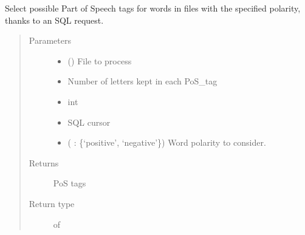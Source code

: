 \documentclass[letterpaper,10pt,english]{sphinxmanual}
\begin{document}
\begin{fulllineitems}
\label{\detokenize{analysis:loacore.analysis.frequencies.get_polarity_pos_tag_set}}
Select possible Part of Speech tags for words in files with the specified polarity, thanks to an SQL request.
\begin{quote}\begin{description}
\item[{Parameters}] \leavevmode\begin{itemize}
\item {} 
 ({\hyperref[\detokenize{classes:loacore.classes.classes.File}]{}}) \textendash{} File to process

\item {} 
 \textendash{} Number of letters kept in each PoS\_tag

\item {} 
 \textendash{} int

\item {} 
 \textendash{} SQL cursor

\item {} 
 ( : \{‘positive’, ‘negative’\}) \textendash{} Word polarity to consider.

\end{itemize}

\item[{Returns}] \leavevmode
PoS tags

\item[{Return type}] \leavevmode
{} of 

\end{description}\end{quote}

\end{fulllineitems}

\end{document}
